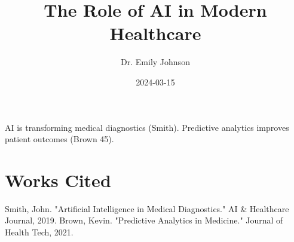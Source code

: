 \documentclass{article}
\title{The Role of AI in Modern Healthcare}
\author{Dr. Emily Johnson}
\date{2024-03-15}
\begin{document}
\maketitle
AI is transforming medical diagnostics (Smith). Predictive analytics improves patient outcomes (Brown 45).
\section{Works Cited}
Smith, John. "Artificial Intelligence in Medical Diagnostics." AI \& Healthcare Journal, 2019.
Brown, Kevin. "Predictive Analytics in Medicine." Journal of Health Tech, 2021.
\end{document}
